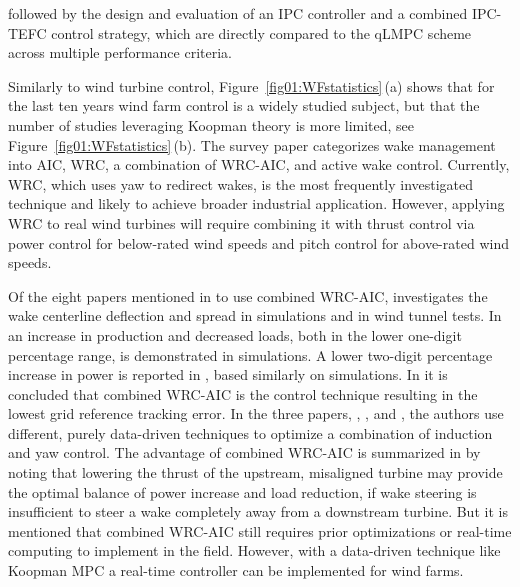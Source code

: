 followed by the design and evaluation of an IPC controller and a combined IPC-TEFC control strategy, which are directly compared to the qLMPC scheme across multiple performance criteria.

Similarly to wind turbine control, Figure~\ref{fig01:WFstatistics}\,(a) shows that for the last ten years wind farm control is a widely studied subject, but that the number of studies leveraging Koopman theory is more limited, see Figure~\ref{fig01:WFstatistics}\,(b). The survey paper \cite{houck2022review} categorizes wake management into AIC, WRC, a combination of WRC-AIC, and active wake control. Currently, WRC, which uses yaw to redirect wakes, is the most frequently investigated technique and likely to achieve broader industrial application. However, applying WRC to real wind turbines will require combining it with thrust control via power control for below-rated wind speeds and pitch control for above-rated wind speeds.

Of the eight papers mentioned in \cite{houck2022review} to use combined WRC-AIC, \cite{jimenez2010application} investigates the wake centerline deflection and spread in simulations and \cite{castillo2020wind} in wind tunnel tests. In \cite{bossanyi2018combining} an increase in production and decreased loads, both in the lower one-digit percentage range, is demonstrated in simulations. A lower two-digit percentage increase in power is reported in \cite{cossu2020wake}, based similarly on simulations. In \cite{fleming2016computational} it is concluded that combined WRC-AIC is the control technique resulting in the lowest grid reference tracking error. In the three papers, \cite{park2013wind}, \cite{park2015cooperative}, and \cite{en10070852}, the authors use different, purely data-driven techniques to optimize a combination of induction and yaw control. The advantage of combined WRC-AIC is summarized in \cite{houck2022review} by noting that lowering the thrust of the upstream, misaligned turbine may provide the optimal balance of power increase and load reduction, if wake steering is insufficient to steer a wake completely away from a downstream turbine. But it is mentioned that combined WRC-AIC still requires prior optimizations or real-time computing to implement in the field. However, with a data-driven technique like Koopman MPC a real-time controller can be implemented for wind farms. 

